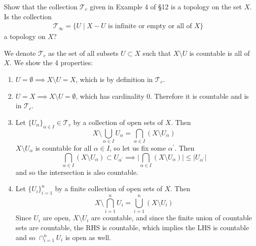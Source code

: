   \begin{exercise}[Munkres 13.3]
    Show that the collection $\mathcal{T}_c$ given in Example 4 of \S12 is a topology on the set $X$. Is the collection
    \begin{align*}
      \mathcal{T}_\infty = \{U \mid X - U \text{ is infinite or empty or all of } X\}
    \end{align*}
    a topology on $X$?
  \end{exercise}
  \begin{solution}[Munkres 13.3]
    We denote $\mathcal{T}_c$ as the set of all subsets $U \subset X$ such that $X \setminus U$ is countable is all of $X$. We show the 4 properties: 
    \begin{enumerate}
      \item $U = \emptyset \implies X \setminus U = X$, which is by definition in $\mathcal{T}_c$. 
      \item $U = X \implies X \setminus U = \emptyset$, which has cardinality $0$. Therefore it is countable and is in $\mathcal{T}_c$. 

      \item Let $\{U_\alpha\}_{\alpha \in I} \in \mathcal{T}_c$ by a collection of open sets of $X$. Then 
      \begin{equation}
        X \setminus \bigcup_{\alpha \in I} U_{\alpha} = \bigcap_{\alpha \in I} (X \setminus U_\alpha)
      \end{equation}
      $X \setminus U_\alpha$ is countable for all $\alpha \in I$, so let us fix some $\alpha^\prime$. Then 
      \begin{equation}
        \bigcap_{\alpha \in I} (X \setminus U_\alpha) \subset U_{\alpha^\prime} \implies \bigg| \bigcap_{\alpha \in I} (X \setminus U_\alpha) \bigg| \leq \big| U_{\alpha^\prime} \big| 
      \end{equation}
      and so the intersection is also countable. 
      \item Let $\{U_i\}_{i=1}^n$ by a finite collection of open sets of $X$. Then 
      \begin{equation}
        X \setminus \bigcap_{i=1}^n U_i = \bigcup_{i=1}^n (X \setminus U_i)
      \end{equation}
      Since $U_i$ are open, $X \setminus U_i$ are countable, and since the finite union of countable sets are countable, the RHS is countable, which implies the LHS is countable and so $\cap_{i=1}^n U_i$ is open as well. 
    \end{enumerate}


\end{solution}
